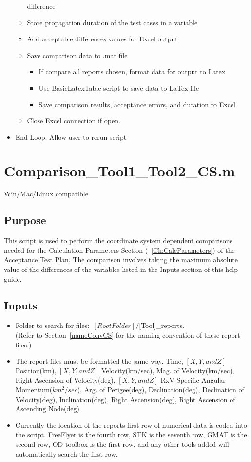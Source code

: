 \begin{itemize}
\begin{itemize}
        difference
        \item Store propagation duration of the test cases in a
        variable
        \item Add acceptable differences values for Excel output
        \item Save comparison data to .mat file
        \begin{itemize}
            \item If compare all reports chosen, format data for
            output to Latex
            \item Use BasicLatexTable script to save data to LaTex
            file
            \item Save comparison results, acceptance errors, and
            duration to Excel
        \end{itemize}
        \item Close Excel connection if open.
    \end{itemize}
    \item End Loop. Allow user to rerun script
\end{itemize}

\section{Comparison\_Tool1\_Tool2\_CS.m}
Win/Mac/Linux compatible
\subsection{Purpose}
This script is used to perform the coordinate system dependent
comparisons needed for the Calculation Parameters Section
(~\ref{Ch:CalcParameters}) of the Acceptance Test Plan. The
comparison involves taking the maximum absolute value of the
differences of the variables listed in the Inputs section of this
help guide.
\subsection{Inputs}
\begin{itemize}
    \item Folder to search for files$:$ $[Root Folder]/[$Tool$]$\_reports. \\
    (Refer to Section~\ref{nameConvCS} for the naming convention
    of these report files.)
    \item The report files must be formatted the same way. Time, $[X,Y,and Z]$
    Position(km), $[X,Y,and Z]$ Velocity(km/sec), Mag. of
    Velocity(km/sec), Right Ascension of Velocity(deg), $[X,Y,and Z]$
    RxV-Specific Angular Momentum($km^2/sec$), Arg. of Perigee(deg),
    Declination(deg), Declination of Velocity(deg), Inclination(deg),
    Right Ascension(deg), Right Ascension of Ascending Node(deg)
    \item Currently the location of the reports first row of numerical
    data is coded into the script. FreeFlyer is the fourth row, STK is
    the seventh row, GMAT is the second row, OD toolbox is the first
    row, and any other tools added will automatically search the first
    row.
\end{itemize}
